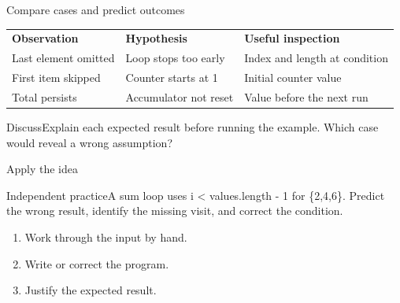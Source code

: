 \documentclass[10pt,aspectratio=169]{beamer}
\begin{document}
\begin{frame}[fragile,t]{Compare cases and predict outcomes}
\small\renewcommand{\arraystretch}{1.5}
\begin{tabularx}{\textwidth}{>{\raggedright\arraybackslash}X>{\raggedright\arraybackslash}X>{\raggedright\arraybackslash}X}\rowcolor{navy}
\color{white}\bfseries Observation & \color{white}\bfseries Hypothesis & \color{white}\bfseries Useful inspection\\
Last element omitted & Loop stops too early & Index and length at condition\\
First item skipped & Counter starts at 1 & Initial counter value\\
Total persists & Accumulator not reset & Value before the next run\\
\end{tabularx}\par\vspace{3mm}\begin{exampleblock}{Discuss}Explain each expected result before running the example. Which case would reveal a wrong assumption?\end{exampleblock}
\end{frame}

\begin{frame}[fragile,t]{Apply the idea}
\begin{alertblock}{Independent practice}A sum loop uses i \textless{} values.length - 1 for \{2,4,6\}. Predict the wrong result, identify the missing visit, and correct the condition.\end{alertblock}\vspace{3mm}\begin{enumerate}\item Work through the input by hand.\item Write or correct the program.\item Justify the expected result.\end{enumerate}
\end{frame}
\end{document}
